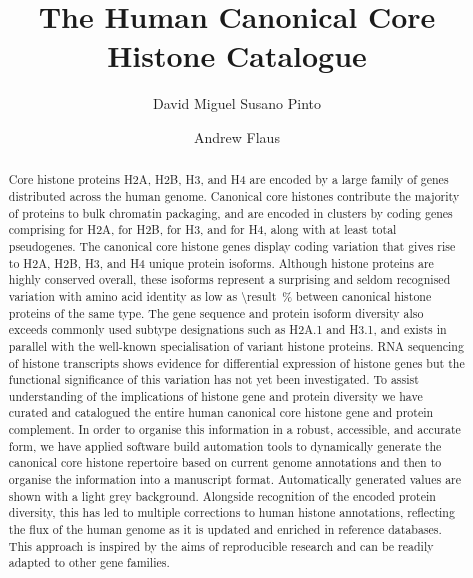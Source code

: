 \documentclass[9pt,lineno]{elife}
\title{The Human Canonical Core Histone Catalogue}
\author[1,\authfn{1}]{David Miguel Susano Pinto}
\author[1]{Andrew Flaus}
\affil[1]{Centre for Chromosome Biology, School of Natural Sciences,
  National University of Ireland Galway, Galway, Ireland}
\begin{document}
  \maketitle

  \begin{abstract}
    Core histone proteins H2A, H2B, H3, and H4 are encoded
    by a large family of genes distributed across the human genome.
    Canonical core histones contribute the majority of proteins to bulk chromatin packaging,
    and are encoded in \NumberOfClusters{} clusters
    by \TotalCoreCodingGenes{} coding genes comprising
    \HTwoACodingGenes{} for H2A,
    \HTwoBCodingGenes{} for H2B,
    \HThreeCodingGenes{} for H3,
    and \HFourCodingGenes{} for H4,
    along with at least \TotalCorePseudoGenes{} total pseudogenes.
    The canonical core histone genes display coding variation that gives rise to
    \HTwoAUniqueProteins{} H2A, \HTwoBUniqueProteins{} H2B,
    \HThreeUniqueProteins{} H3, and \HFourUniqueProteins{} H4 unique protein isoforms.
    Although histone proteins are highly conserved overall,
    these isoforms represent a surprising and seldom recognised variation
    with amino acid identity as low as
     \SI{\result}{\percent}
    between canonical histone proteins of the same type.
    The gene sequence and protein isoform diversity
    also exceeds commonly used subtype designations such as H2A.1 and H3.1,
    and exists in parallel with the well-known specialisation of variant histone proteins.
    RNA sequencing of histone transcripts shows evidence for
    differential expression of histone genes
    but the functional significance of this variation has not yet been investigated.
    To assist understanding of the implications of histone gene and protein diversity
    we have curated and catalogued the entire human canonical core
    histone gene and protein complement.
    In order to organise this information in a
    robust, accessible, and accurate form,
    we have applied software build automation tools to
    dynamically generate the canonical core histone repertoire
    based on current genome annotations
    and then to organise the information into a manuscript format.
    Automatically generated values are shown with a light grey background.
    Alongside recognition of the encoded protein diversity,
    this has led to multiple corrections to human histone annotations,
    reflecting the flux of the human genome as it is updated and
    enriched in reference databases.
    This approach is inspired by the aims of reproducible research
    and can be readily adapted to other gene families.
  \end{abstract}
\end{document}
